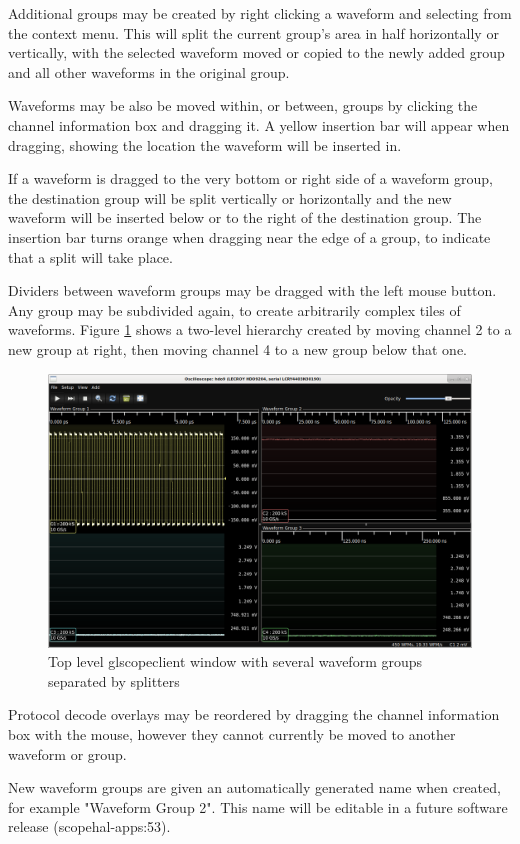Additional groups may be created by right clicking a waveform and selecting  from the context menu. This will split the current group's area in half horizontally or
vertically, with the selected waveform moved or copied to the newly added group and all other waveforms in the original
group.

Waveforms may be also be moved within, or between, groups by clicking the channel information box and dragging it. A
yellow insertion bar will appear when dragging, showing the location the waveform will be inserted in.

If a waveform is dragged to the very bottom or right side of a waveform group, the destination group will be split
vertically or horizontally and the new waveform will be inserted below or to the right of the destination group. The
insertion bar turns orange when dragging near the edge of a group, to indicate that a split will take place.

Dividers between waveform groups may be dragged with the left mouse button. Any group may be subdivided again, to
create arbitrarily complex tiles of waveforms. Figure \ref{multiple-groups} shows a two-level hierarchy created by
moving channel 2 to a new group at right, then moving channel 4 to a new group below that one.

\begin{figure}[h]
\centering
\includegraphics[width=14cm]{images/multiple-groups.png}
\caption{Top level glscopeclient window with several waveform groups separated by splitters}
\label{multiple-groups}
\end{figure}

Protocol decode overlays may be reordered by dragging the channel information box with the mouse, however they cannot
currently be moved to another waveform or group.

New waveform groups are given an automatically generated name when created, for example "Waveform Group 2". This name
will be editable in a future software release (scopehal-apps:53).
